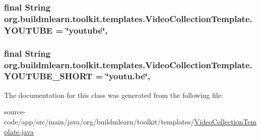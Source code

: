 \subsubsection[{\texorpdfstring{Y\+O\+U\+T\+U\+BE}{YOUTUBE}}]{\setlength{\rightskip}{0pt plus 5cm}final String org.\+buildmlearn.\+toolkit.\+templates.\+Video\+Collection\+Template.\+Y\+O\+U\+T\+U\+BE = \char`\"{}youtube\char`\"{}\hspace{0.3cm}{\ttfamily [static]}, {\ttfamily [private]}}\hypertarget{classorg_1_1buildmlearn_1_1toolkit_1_1templates_1_1VideoCollectionTemplate_a085ed868eeac2dbdd88c9e283fa215aa}{}\label{classorg_1_1buildmlearn_1_1toolkit_1_1templates_1_1VideoCollectionTemplate_a085ed868eeac2dbdd88c9e283fa215aa}
\subsubsection[{\texorpdfstring{Y\+O\+U\+T\+U\+B\+E\+\_\+\+S\+H\+O\+RT}{YOUTUBE_SHORT}}]{\setlength{\rightskip}{0pt plus 5cm}final String org.\+buildmlearn.\+toolkit.\+templates.\+Video\+Collection\+Template.\+Y\+O\+U\+T\+U\+B\+E\+\_\+\+S\+H\+O\+RT = \char`\"{}youtu.\+be\char`\"{}\hspace{0.3cm}{\ttfamily [static]}, {\ttfamily [private]}}\hypertarget{classorg_1_1buildmlearn_1_1toolkit_1_1templates_1_1VideoCollectionTemplate_ada408bfc90e499ef15ace12bb58aa505}{}\label{classorg_1_1buildmlearn_1_1toolkit_1_1templates_1_1VideoCollectionTemplate_ada408bfc90e499ef15ace12bb58aa505}


The documentation for this class was generated from the following file\+:\begin{DoxyCompactItemize}
\item 
source-\/code/app/src/main/java/org/buildmlearn/toolkit/templates/\hyperlink{VideoCollectionTemplate_8java}{Video\+Collection\+Template.\+java}\end{DoxyCompactItemize}
